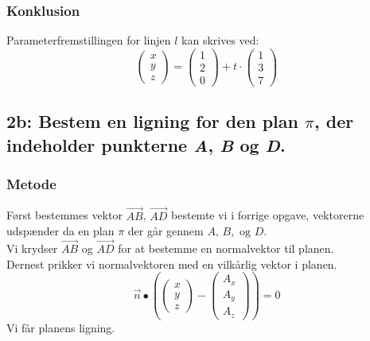 \documentclass[../main.tex]{subfiles}
\begin{document}
    \subsubsection*{Konklusion}
        Parameterfremstillingen for linjen \(l\) kan skrives ved:
        \[\begin{pmatrix} x \\ y\\ z\end{pmatrix}=\begin{pmatrix}1\\ 2\\0 \end{pmatrix}+ t \cdot \begin{pmatrix} 1 \\ 3\\ 7\end{pmatrix}\]
\clearpage
\subsection*{2b: Bestem en ligning for den plan \(\pi\), der indeholder punkterne \textit{A}, \textit{B} og \textit{D}.}
    \subsubsection*{Metode}
        Først bestemmes vektor \(\overrightarrow{AB}\), \(\overrightarrow{AD}\) bestemte vi i forrige opgave, vektorerne udspænder da en plan \(\pi\) der går gennem \(A,\, B,\text{ og } D\).\\
        Vi krydser \(\overrightarrow{AB}\) og \(\overrightarrow{AD}\) for at bestemme en normalvektor til planen.\\
        Dernest prikker vi normalvektoren med en vilkårlig vektor i planen.
        \[\overrightarrow{n}\bullet \left(\begin{pmatrix} x \\ y \\ z \end{pmatrix}-\begin{pmatrix}A_x \\A_y\\A_z \end{pmatrix}\right)=0\]
        Vi får planens ligning.
\end{document}
